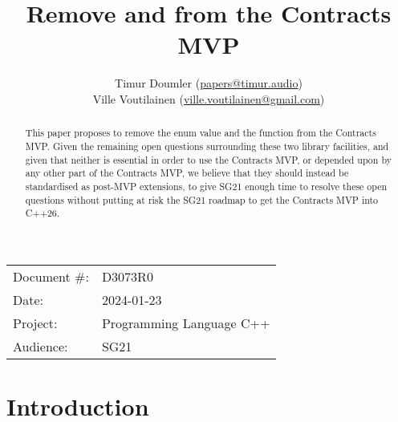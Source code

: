 

 \usepackage[bottom]{footmisc} 


\title{Remove  and  from the Contracts MVP}
\author{ Timur Doumler \small(\href{mailto:papers@timur.audio}{papers@timur.audio}) \\
Ville Voutilainen \small(\href{mailto:ville.voutilainen@gmail.com}{ville.voutilainen@gmail.com})  
}
\date{}
\maketitle

\begin{tabular}{ll}
Document \#: & D3073R0 \\
Date: &2024-01-23 \\
Project: & Programming Language C++ \\
Audience: & SG21
\end{tabular}

\begin{abstract}
This paper proposes to remove the enum value  and the function \mbox{} from the Contracts MVP. Given the remaining open questions surrounding these two library facilities, and given that neither is essential in order to use the Contracts MVP, or depended upon by any other part of the Contracts MVP, we believe that they should instead be standardised as post-MVP extensions, to give SG21 enough time to resolve these open questions without putting at risk the SG21 roadmap to get the Contracts MVP into C++26.
\end{abstract}

\section{Introduction}
\label{sec:intro}

